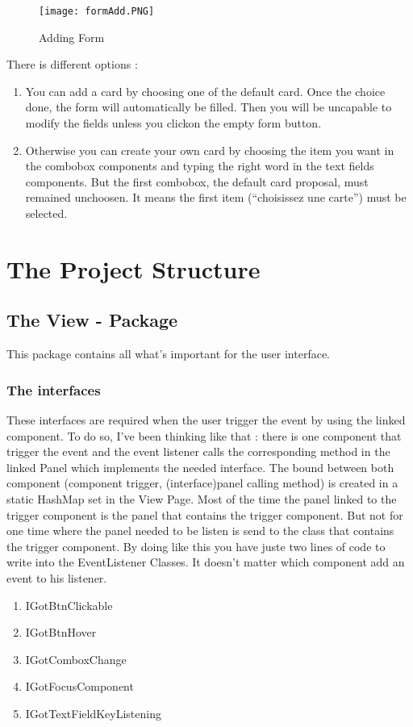 \documentclass{article}
\begin{document}
\begin{block}
\begin{wrapfigure}{l}{0.4\textwidth}
    \begin{center}
        \texttt{[image: formAdd.PNG]}
    \end{center}
     \caption{Adding Form}
\end{wrapfigure}
There is different options :
\begin{enumerate}
\item You can add a card by choosing one of the default card. Once the choice done, the form will automatically be filled. Then you will be uncapable to modify the fields unless you clickon the empty form button.
\item Otherwise you can create your own card by choosing the item you want in the combobox components and typing the right word in the text fields components. But the first combobox, the default card proposal, must remained unchoosen. It means the first item (``choisissez une carte'') must be selected.
\end{enumerate}
\end{block}


\section{The Project Structure}\label{the-project-structure}
\subsection{The View - Package}\label{the-view---package}
This package contains all what's important for the user interface.
\subsubsection{The interfaces}\label{the-interfaces}
These interfaces are required when the user
trigger the event by using the linked component. To do so, I've been
thinking like that : there is one component that trigger the event and the event listener calls the corresponding method in the linked Panel which implements the needed interface. The bound between both component (component trigger, (interface)panel calling method) is created in a static HashMap set in the View Page. Most of the time the panel linked to the trigger component is the panel that contains the trigger component. But not for one time where the panel needed to be listen is send to the class that contains the trigger component. By doing like this you have juste two lines of code to write into the EventListener Classes. It doesn't matter which component add an event to his listener.
\begin{enumerate}
\item IGotBtnClickable
\item IGotBtnHover
\item IGotComboxChange
\item IGotFocusComponent
\item IGotTextFieldKeyListening
\end{enumerate}
\end{document}
